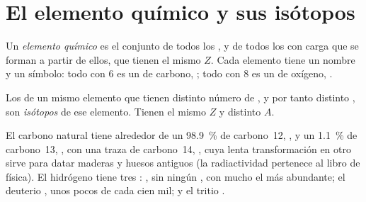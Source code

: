 \section{El elemento químico y sus isótopos}

\begin{definition}\label{def:g9:inside-the-atom:element}
Un \emph{elemento químico} es el conjunto de
todos los , y de todos los  con carga que se forman a partir
de ellos, que tienen el mismo  $Z$. Cada elemento tiene
un nombre y un símbolo: todo  con 6  es un  de
carbono, ; todo  con 8  es un  de oxígeno,
.
\end{definition}

\begin{definition}[Isótopos]\label{def:g9:inside-the-atom:isotope}
Los  de un mismo elemento que tienen distinto número de
, y por tanto distinto , son
\emph{isótopos} de ese elemento. Tienen el mismo $Z$ y
distinto $A$.
\end{definition}

\begin{example}\label{ex:g9:inside-the-atom:isotopes}
El carbono natural tiene alrededor de un \qty{98.9}{\percent} de
carbono~12, , y un \qty{1.1}{\percent} de carbono~13,
, con una traza de carbono~14, , cuya
lenta transformación en otro  sirve para datar maderas y huesos
antiguos (la radiactividad pertenece al libro de física). El hidrógeno
tiene tres : , sin ningún , con mucho el
más abundante; el deuterio , unos pocos  de cada
cien mil; y el tritio .
\end{example}

